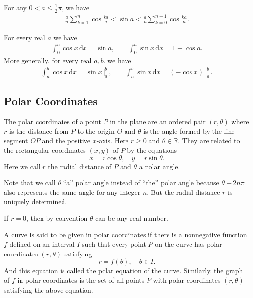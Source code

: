 \documentclass[a4paper]{ctexart}
\begin{document}
	\begin{mythm}
		For any $0<a\le \tfrac12\pi$, we have
		\begin{align*}
			\frac{a}{n}\sum_{k=1}^{n}\cos\frac{ka}{n}<\sin a
			<
			\frac{a}{n}\sum_{k=0}^{n-1}\cos\frac{ka}{n}.
		\end{align*}
	\end{mythm}
	\begin{mythm}
		For every real $a$ we have
		\begin{align*}
			\int_0^a \cos x\,\mathrm{d}x = \sin a,\qquad
			\int_0^a \sin x\, \mathrm{d}x = 1-\cos a.
		\end{align*}
		More generally, for every real $a,b$, we have
		\begin{align*}
			\int_a^b \cos x\,\mathrm{d}x = \sin x\,\Big|^b_a\, ,\qquad
			\int_a^b \sin x\, \mathrm{d}x = (-\cos x)\, \Big|^b_a\, .
		\end{align*}
	\end{mythm}

	\subsection{Polar Coordinates}
	\begin{mydef}
		The polar coordinates of a point $P$ in the plane are an ordered pair $(r,\theta)$ where $r$ is the distance from $P$ to the origin $O$ and $\theta$ is the angle formed by the line segment $OP$ and the positive $x$-axis. Here $r\ge 0$ and $\theta\in \mathbb{R}$. They are related to the rectangular coordinates $(x,y)$ of $P$ by the equations
		\[
		x=r\cos \theta,\quad y=r\sin \theta.
		\]
		Here we call $r$ the radial distance of $P$ and $\theta$ a polar angle.
	\end{mydef}
	\begin{myrmk}
		Note that we call $\theta$ ``a'' polar angle instead of ``the'' polar angle because $\theta+2n\pi$ also represents the same angle for any integer $n$. But the radial distance $r$ is uniquely determined. 
		
		If $r=0$, then by convention $\theta$ can be any real number.
	\end{myrmk}
	\begin{mydef}
		A curve is said to be given in polar coordinates if there is a nonnegative function $f$ defined on an interval $I$ such that every point $P$ on the curve has polar coordinates $(r,\theta)$ satisfying
		\[
		r=f(\theta),\quad \theta\in I.
		\]
		And this equation is called the polar equation of the curve. Similarly, the graph of $f$ in polar coordinates is the set of all points $P$ with polar coordinates $(r,\theta)$ satisfying the above equation.
	\end{mydef}
\end{document}
